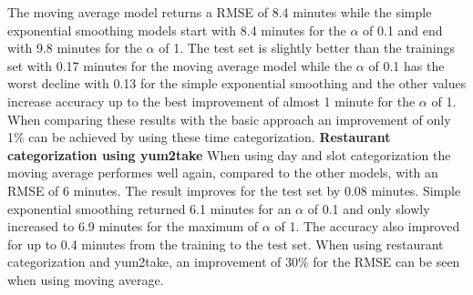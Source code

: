 The moving average model returns a RMSE of 8.4 minutes while the simple exponential smoothing models start with 8.4 minutes for the $\alpha$ of 0.1 and end with 9.8 minutes for the $\alpha$ of 1. The test set is slightly better than the trainings set with 0.17 minutes for the moving average model while the $\alpha$ of 0.1 has the worst decline with 0.13 for the simple exponential smoothing and the other values increase accuracy up to the best improvement of almost 1 minute for the $\alpha$ of 1.\newline
When comparing these results with the basic approach an improvement of only 1\% can be achieved by using these time categorization.
\newline\newline\textbf{Restaurant categorization using yum2take}\newline
When using day and slot categorization the moving average performes well again, compared to the other models, with an RMSE of 6 minutes. The result improves for the test set by 0.08 minutes. Simple exponential smoothing returned 6.1 minutes for an $\alpha$ of 0.1 and only slowly increased to 6.9 minutes for the maximum of $\alpha$ of 1. The accuracy also improved for up to 0.4 minutes from the training to the test set.\newline
When using restaurant categorization and yum2take, an improvement of 30\% for the RMSE can be seen when using moving average.

